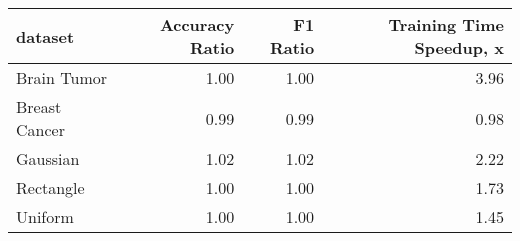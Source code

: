 \begin{tabular}{lrrr}
\toprule
dataset & Accuracy Ratio & F1 Ratio & Training Time Speedup, x \\
\midrule
Brain Tumor & 1.00 & 1.00 & 3.96 \\
Breast Cancer & 0.99 & 0.99 & 0.98 \\
Gaussian & 1.02 & 1.02 & 2.22 \\
Rectangle & 1.00 & 1.00 & 1.73 \\
Uniform & 1.00 & 1.00 & 1.45 \\
\bottomrule
\end{tabular}
